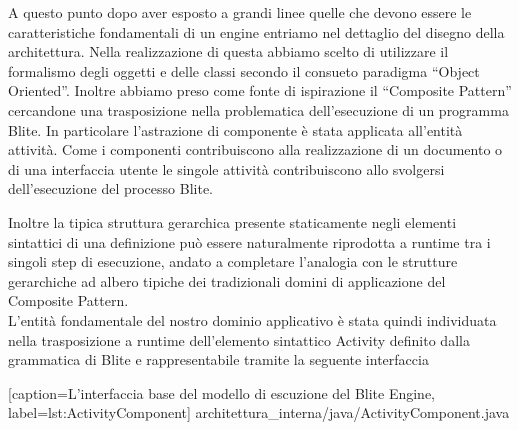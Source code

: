 A questo punto dopo aver esposto a grandi linee quelle che devono essere le
caratteristiche fondamentali di un engine entriamo nel dettaglio del disegno
della architettura. Nella realizzazione di questa abbiamo scelto di utilizzare
il formalismo degli oggetti e delle classi secondo il consueto paradigma
``Object Oriented''. Inoltre abbiamo preso come fonte di
ispirazione il ``Composite Pattern'' cercandone una trasposizione nella
problematica dell'esecuzione di un programma Blite. In particolare
l'astrazione di componente \`e stata applicata all'entità attività. Come i
componenti contribuiscono alla realizzazione di un documento o di una
interfaccia utente le singole attività contribuiscono allo svolgersi
dell'esecuzione del processo Blite.
 
Inoltre la tipica struttura gerarchica presente staticamente negli elementi
sintattici di una definizione può essere naturalmente riprodotta a runtime tra
i singoli step di esecuzione, andato a completare l'analogia con le strutture
gerarchiche ad albero tipiche dei tradizionali domini di applicazione del
Composite Pattern. 
\\

L'entità fondamentale del nostro dominio applicativo \`e stata quindi
individuata nella  trasposizione a runtime
dell'elemento sintattico Activity definito dalla grammatica di Blite e 
rappresentabile tramite la seguente interfaccia


[caption={L'interfaccia base del modello di escuzione del Blite Engine},
label=lst:ActivityComponent]
{architettura_interna/java/ActivityComponent.java}

